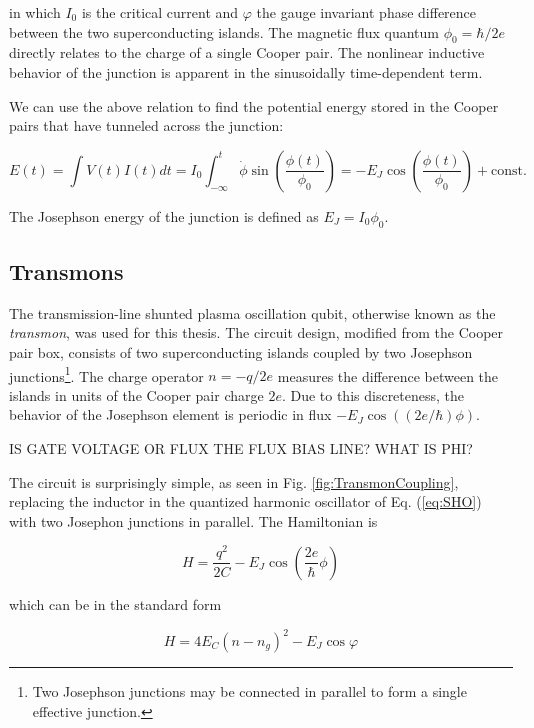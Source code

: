 \documentclass[11 pt, oneside]{book} %
\begin{document}
in which $I_0$ is the critical current and $\varphi$ the gauge invariant phase difference between the two superconducting islands. The magnetic flux quantum $\phi_0=\hbar/2e$ directly relates to the charge of a single Cooper pair. The nonlinear inductive behavior of the junction is apparent in the sinusoidally time-dependent term. 

We can use the above relation to find the potential energy stored in the Cooper pairs that have tunneled across the junction:

\begin{equation}
E(t)=\int V(t)I(t)dt = I_0\int_{-\infty}^{t}    \dot{\phi}\sin\left(\frac{\phi(t)}{\phi_0}\right)=
-E_J\cos\left(\frac{\phi(t)}{\phi_0}\right)+\mathrm{const}.
\end{equation}

The Josephson energy of the junction is defined as $E_J=I_0\phi_0$.


\subsection{Transmons}\label{sec:Transmons}
The transmission-line shunted plasma oscillation qubit\cite{Koch}, otherwise known as the \emph{transmon}, was used for this thesis. The circuit design, modified from the Cooper pair box\cite{Bouchiat, Nakamura}, consists of two superconducting islands coupled by two Josephson junctions\footnote{Two Josephson junctions may be connected in parallel to form a single effective junction.}. The charge operator $n=-q/2e$ measures the difference between the islands in units of the Cooper pair charge $2e$. Due to this discreteness, the behavior of the Josephson element is periodic in flux $-E_J\cos((2e/\hbar)\phi)$. 

IS GATE VOLTAGE OR FLUX THE FLUX BIAS LINE? WHAT IS PHI?

The circuit is surprisingly simple, as seen in Fig. \ref{fig:TransmonCoupling}, replacing the inductor in the quantized harmonic oscillator of Eq. (\ref{eq:SHO}) with two Josephon junctions in parallel. The Hamiltonian is

\begin{equation}
H=\frac{q^2}{2C}-E_J\cos\left(   \frac{2e}{\hbar}\phi     \right)
\end{equation}

which can be in the standard form

\begin{equation}\label{eq:TransmonHamiltonian}
H=4E_C(n-n_g)^2-E_J\cos\varphi
\end{equation}
\end{document}
